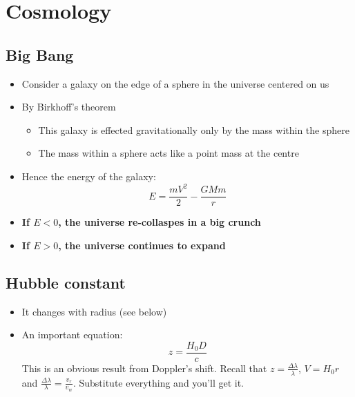 \documentclass{article}
\begin{document}
\section{Cosmology}
\subsection{Big Bang}
\begin{itemize}
\item Consider a galaxy on the edge of a sphere in the universe centered on us
\item By Birkhoff's theorem
\begin{itemize}
    \item This galaxy is effected gravitationally only by the mass within the sphere
    \item The mass within a sphere acts like a point mass at the centre
\end{itemize}
\item Hence the energy of the galaxy:
\begin{equation}
    E=\frac{mV^2}{2}-\frac{GMm}{r}
\end{equation}
\item \textbf{If $E<0$, the universe re-collaspes in a big crunch}
\item \textbf{If $E>0$, the universe continues to expand}
\end{itemize}
\subsection{Hubble constant}
\begin{itemize}
    \item It changes with radius (see below)
    \item An important equation:
    \begin{equation}
        z=\frac{H_0D}{c}
    \end{equation}
This is an obvious result from Doppler's shift. Recall that $z=\frac{\Delta \lambda}{\lambda}$, $V=H_0r$ and $\frac{\Delta \lambda}{\lambda}=\frac{v_r}{v_w}$. Substitute everything and you'll get it.
\end{itemize}
\end{document}
